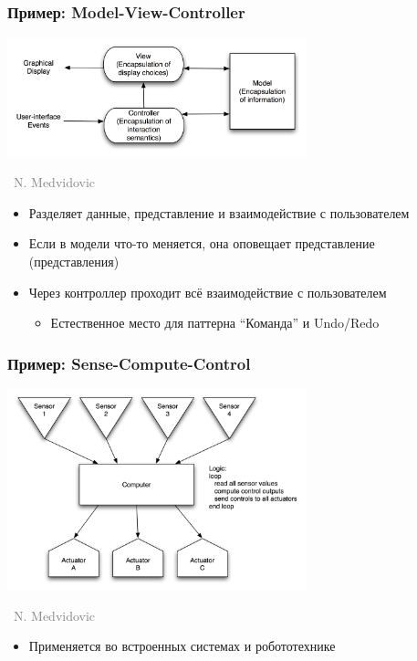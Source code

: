 \documentclass[xetex,mathserif,serif]{beamer}
\newcommand{\attribution}[1] {
    \vspace{-5mm}\begin{flushright}\begin{scriptsize}\textcolor{gray}{\textcopyright\, #1}\end{scriptsize}\end{flushright}
}
\begin{document}
    \begin{frame}
        \frametitle{Пример: Model-View-Controller}
        \begin{center}
            \includegraphics[width=0.65\textwidth]{mvc.png}
            \attribution{N. Medvidovic}
        \end{center}
        \begin{itemize}
            \item Разделяет данные, представление и взаимодействие с пользователем
            \item Если в модели что-то меняется, она оповещает представление (представления)
            \item Через контроллер проходит всё взаимодействие с пользователем
            \begin{itemize}
                \item Естественное место для паттерна ``Команда'' и Undo/Redo
            \end{itemize}
        \end{itemize}
    \end{frame}

    \begin{frame}
        \frametitle{Пример: Sense-Compute-Control}
        \begin{center}
            \includegraphics[width=0.65\textwidth]{senseComputeControl.png}
            \attribution{N. Medvidovic}
        \end{center}
        \begin{itemize}
            \item Применяется во встроенных системах и робототехнике
        \end{itemize}
    \end{frame}
\end{document}
